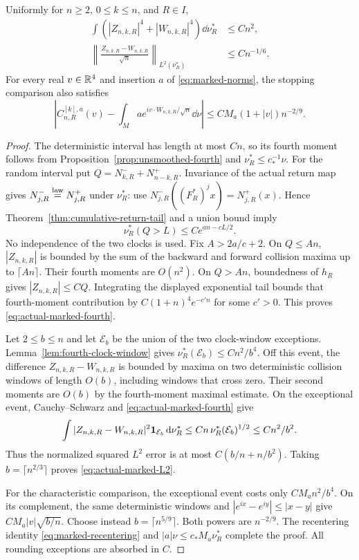 \begin{theorem}
\label{thm:marked-L2-stopping}
Uniformly for $n\ge2$, $0\le k\le n$, and $R\in I$,
\begin{align}
 \int (|Z_{n,k,R}|^4+|W_{n,k,R}|^4)\dd\nu_R^*&\le Cn^2,
       \label{eq:actual-marked-fourth}\\
 \left\|\frac{Z_{n,k,R}-W_{n,k,R}}{\sqrt n}
                  \right\|_{L^2(\nu_R^*)}&\le Cn^{-1/6}.
       \label{eq:actual-marked-L2}
\end{align}
For every real $v\in\mathbb R^4$ and insertion $a$ of
\eqref{eq:marked-norms}, the stopping comparison also satisfies
\begin{equation}\label{eq:improved-marked-stopping}
 \left|C^{[k],a}_{n,R}(v)
       -\int_M a e^{iv\cdot W_{n,k,R}/\sqrt n}\dd\nu\right|
       \le C M_a(1+|v|)n^{-2/9}.
\end{equation}
\end{theorem}
\begin{proof}
The deterministic interval has length at most $Cn$, so its fourth
moment follows from Proposition~\ref{prop:unsmoothed-fourth} and
$\nu_R^*\le c_*^{-1}\nu$. For the random interval put
$Q=N^-_{k,R}+N^+_{n-k,R}$. Invariance of the actual return map gives
$N^-_{j,R}\overset{\rm law}=N^+_{j,R}$ under $\nu_R^*$: use
$N^-_{j,R}((F_R^*)^jx)=N^+_{j,R}(x)$. Hence
Theorem~\ref{thm:cumulative-return-tail} and a union bound imply
\[
 \nu_R^*(Q>L)\le C e^{an-cL/2}.
\]
No independence of the two clocks is used. Fix $A>2a/c+2$.
On $Q\le An$, $|Z_{n,k,R}|$ is bounded by the sum of the backward
and forward collision maxima up to $\lceil An\rceil$. Their fourth
moments are $O(n^2)$. On $Q>An$, boundedness of $h_R$ gives
$|Z_{n,k,R}|\le C Q$. Integrating the displayed exponential tail
bounds that fourth-moment contribution by
$C(1+n)^4e^{-c' n}$ for some $c'>0$. This proves
\eqref{eq:actual-marked-fourth}.

Let $2\le b\le n$ and let $\mathcal E_b$ be the union of the two
clock-window exceptions. Lemma~\ref{lem:fourth-clock-window} gives
$\nu_R^*(\mathcal E_b)\le Cn^2/b^4$. Off this event, the difference
$Z_{n,k,R}-W_{n,k,R}$ is bounded by maxima on two deterministic
collision windows of length $O(b)$, including windows that cross zero.
Their second moments are $O(b)$ by the fourth-moment maximal estimate.
On the exceptional event, Cauchy--Schwarz and
\eqref{eq:actual-marked-fourth} give
\[
 \int |Z_{n,k,R}-W_{n,k,R}|^2\mathbf1_{\mathcal E_b}\,\mathrm d\nu_R^*
       \le Cn\,\nu_R^*(\mathcal E_b)^{1/2}\le Cn^2/b^2.
\]
Thus the normalized squared $L^2$ error is at most
$C(b/n+n/b^2)$. Taking $b=\lceil n^{2/3}\rceil$ proves
\eqref{eq:actual-marked-L2}.

For the characteristic comparison, the exceptional event costs only
$CM_a n^2/b^4$. On its complement, the same deterministic windows and
$|e^{ix}-e^{iy}|\le|x-y|$ give $CM_a|v|\sqrt{b/n}$.
Choose instead $b=\lceil n^{5/9}\rceil$. Both powers are
$n^{-2/9}$. The recentering identity
\eqref{eq:marked-recentering} and $|a|\nu\le c_*M_a\nu_R^*$
complete the proof. All rounding exceptions are absorbed in $C$.
\end{proof}

